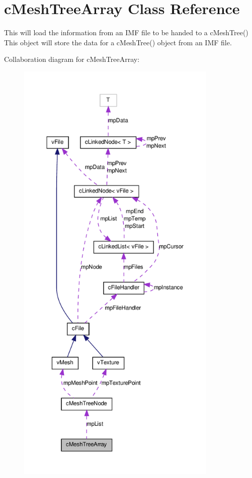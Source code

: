 \hypertarget{classc_mesh_tree_array}{
\section{cMeshTreeArray Class Reference}
\label{classc_mesh_tree_array}
}


This will load the information from an IMF file to be handed to a cMeshTree() This object will store the data for a cMeshTree() object from an IMF file.  




Collaboration diagram for cMeshTreeArray:
\nopagebreak
\begin{figure}[H]
\begin{center}
\leavevmode
\includegraphics[height=600pt]{classc_mesh_tree_array__coll__graph}
\end{center}
\end{figure}
